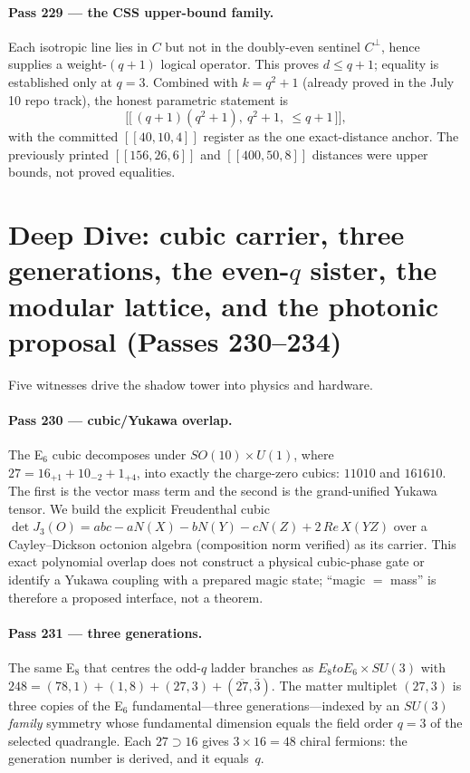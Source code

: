 \documentclass[12pt,a4paper]{article}
\def\mathbb#1{#1}%
\def\mathrm#1{#1}%
\def\mathbf#1{#1}%
\def\cdot{ }%
\def\to{ to }%
\theoremstyle{definition}
\begin{document}
\paragraph{Pass 229 --- the CSS upper-bound family.} Each isotropic line lies in
$C$ but not in the doubly-even sentinel $C^{\perp}$, hence supplies a
weight-$(q{+}1)$ logical operator. This proves $d\le q+1$; equality is established
only at $q=3$. Combined with $k=q^2+1$ (already proved in the July 10 repo track),
the honest parametric statement is
\[
   \big[\!\big[\,(q+1)(q^2+1),\ q^2+1,\ \le q+1\,\big]\!\big],
\]
with the committed $[[40,10,4]]$ register as the one exact-distance anchor. The
previously printed $[[156,26,6]]$ and $[[400,50,8]]$ distances were upper bounds,
not proved equalities.


\section{Deep Dive: cubic carrier, three generations, the even-$q$ sister, the modular lattice, and the photonic proposal (Passes 230--234)}

Five witnesses drive the shadow tower into physics and hardware.

\paragraph{Pass 230 --- cubic/Yukawa overlap.} The E$_6$ cubic decomposes under $\mathrm{SO}(10)\times
\mathrm U(1)$, where $\mathbf{27}=\mathbf{16}_{+1}+\mathbf{10}_{-2}+\mathbf1_{+4}$,
into exactly the charge-zero cubics: $\mathbf1\cdot\mathbf{10}\cdot\mathbf{10}$
and $\mathbf{16}\cdot\mathbf{16}\cdot\mathbf{10}$. The first is the vector mass
term and the second is the grand-unified Yukawa tensor. We build the explicit Freudenthal
cubic $\det J_3(\mathbb O)=abc-aN(X)-bN(Y)-cN(Z)+2\,\mathrm{Re}\,X(YZ)$ over a
Cayley--Dickson octonion algebra (composition norm verified) as its carrier.
This exact polynomial overlap does not construct a physical cubic-phase
gate or identify a Yukawa coupling with a prepared magic state; ``magic
$=$ mass'' is therefore a proposed interface, not a theorem.

\paragraph{Pass 231 --- three generations.} The same E$_8$ that centres the
odd-$q$ ladder branches as $E_8\to E_6\times\mathrm{SU}(3)$ with
$248=(78,1)+(1,8)+(27,3)+(\overline{27},\bar3)$. The matter multiplet $(27,3)$
is three copies of the E$_6$ fundamental---three generations---indexed by an
$\mathrm{SU}(3)$ \emph{family} symmetry whose fundamental dimension equals the
field order $q=3$ of the selected quadrangle. Each $\mathbf{27}\supset\mathbf{16}$
gives $3\times16=48$ chiral fermions: the generation number is derived, and it
equals~$q$.
\end{document}
